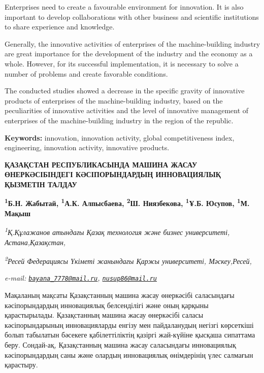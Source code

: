 Enterprises need to create a favourable environment for innovation. It
is also important to develop collaborations with other business and
scientific institutions to share experience and knowledge.

Generally, the innovative activities of enterprises of the
machine-building industry are great importance for the development of
the industry and the economy as a whole. However, for its successful
implementation, it is necessary to solve a number of problems and create
favorable conditions.

The conducted studies showed a decrease in the specific gravity of
innovative products of enterprises of the machine-building industry,
based on the peculiarities of innovative activities and the level of
innovative management of enterprises of the machine-building industry in
the region of the republic.

{\bfseries Keywords:} innovation, innovation activity, global
competitiveness index, engineering, innovation activity, innovative
products.

\begin{articleheader}
{\bfseries ҚАЗАҚСТАН РЕСПУБЛИКАСЫНДА МАШИНА ЖАСАУ ӨНЕРКӘСІБІНДЕГІ КӘСІПОРЫНДАРДЫҢ ИННОВАЦИЯЛЫҚ ҚЫЗМЕТІН ТАЛДАУ}

{\bfseries
\textsuperscript{1}Б.Н. Жабытай\textsuperscript{\envelope },
\textsuperscript{1}А.К. Алпысбаева,
\textsuperscript{2}Ш. Ниязбекова,
\textsuperscript{1}Ұ.Б. Юсупов\textsuperscript{\envelope },
\textsuperscript{1}М. Мақыш}
\end{articleheader}

\begin{affiliation}
\emph{\textsuperscript{1}Қ.Құлажанов атындағы Қазақ технология және бизнес университеті, Астана,Қазақстан,}

\emph{\textsuperscript{2}Ресей Федерациясы Үкіметі жанындағы Қаржы университеті, Мәскеу,Ресей,}

\emph{e-mail: \href{mailto:bayana_7778@mail.ru}{\nolinkurl{bayana\_7778@mail.ru}}, \href{mailto:nusup86@mail.ru}{\nolinkurl{nusup86@mail.ru}}}
\end{affiliation}

Мақаланың мақсаты Қазақстанның машина жасау өнеркәсібі саласындағы
кәсіпорындардың инновациялық белсенділігі және оның қарқыны
қарастырылады. Қазақстанның машина жасау өнеркәсібі саласы
кәсіпорындарының инновацияларды енгізу мен пайдаланудың негізгі
көрсеткіші болып табылатын бәсекеге қабілеттіліктің қазіргі жай-күйіне
қысқаша сипаттама беру. Сондай-ақ, Қазақстанның машина жасау саласындағы
инновациялық кәсіпорындардың саны және олардың инновациялық өнімдерінің
үлес салмағын қарастыру.

